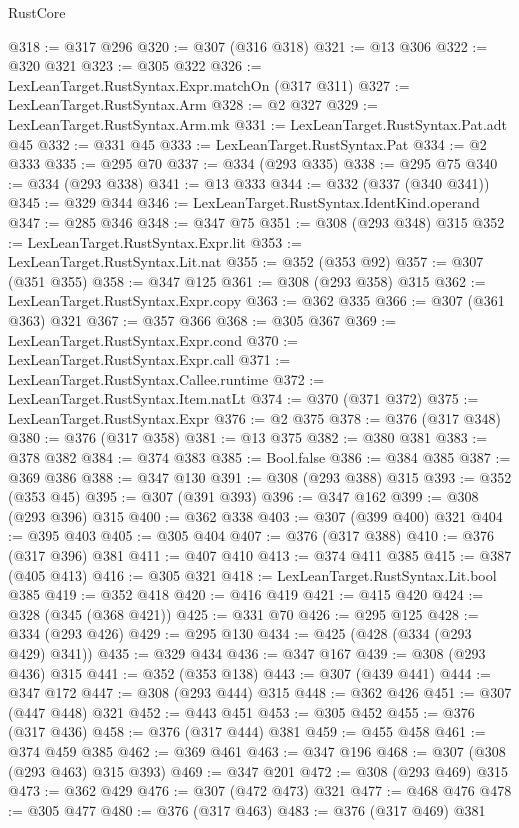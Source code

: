 \begin{lexlean}{RustCore}
\begin{coremodule}
@318 := @317 @296
@320 := @307 (@316 @318)
@321 := @13 @306
@322 := @320 @321
@323 := @305 @322
@326 := LexLeanTarget.RustSyntax.Expr.matchOn (@317 @311)
@327 := LexLeanTarget.RustSyntax.Arm
@328 := @2 @327
@329 := LexLeanTarget.RustSyntax.Arm.mk
@331 := LexLeanTarget.RustSyntax.Pat.adt @45
@332 := @331 @45
@333 := LexLeanTarget.RustSyntax.Pat
@334 := @2 @333
@335 := @295 @70
@337 := @334 (@293 @335)
@338 := @295 @75
@340 := @334 (@293 @338)
@341 := @13 @333
@344 := @332 (@337 (@340 @341))
@345 := @329 @344
@346 := LexLeanTarget.RustSyntax.IdentKind.operand
@347 := @285 @346
@348 := @347 @75
@351 := @308 (@293 @348) @315
@352 := LexLeanTarget.RustSyntax.Expr.lit
@353 := LexLeanTarget.RustSyntax.Lit.nat
@355 := @352 (@353 @92)
@357 := @307 (@351 @355)
@358 := @347 @125
@361 := @308 (@293 @358) @315
@362 := LexLeanTarget.RustSyntax.Expr.copy
@363 := @362 @335
@366 := @307 (@361 @363) @321
@367 := @357 @366
@368 := @305 @367
@369 := LexLeanTarget.RustSyntax.Expr.cond
@370 := LexLeanTarget.RustSyntax.Expr.call
@371 := LexLeanTarget.RustSyntax.Callee.runtime
@372 := LexLeanTarget.RustSyntax.Item.natLt
@374 := @370 (@371 @372)
@375 := LexLeanTarget.RustSyntax.Expr
@376 := @2 @375
@378 := @376 (@317 @348)
@380 := @376 (@317 @358)
@381 := @13 @375
@382 := @380 @381
@383 := @378 @382
@384 := @374 @383
@385 := Bool.false
@386 := @384 @385
@387 := @369 @386
@388 := @347 @130
@391 := @308 (@293 @388) @315
@393 := @352 (@353 @45)
@395 := @307 (@391 @393)
@396 := @347 @162
@399 := @308 (@293 @396) @315
@400 := @362 @338
@403 := @307 (@399 @400) @321
@404 := @395 @403
@405 := @305 @404
@407 := @376 (@317 @388)
@410 := @376 (@317 @396) @381
@411 := @407 @410
@413 := @374 @411 @385
@415 := @387 (@405 @413)
@416 := @305 @321
@418 := LexLeanTarget.RustSyntax.Lit.bool @385
@419 := @352 @418
@420 := @416 @419
@421 := @415 @420
@424 := @328 (@345 (@368 @421))
@425 := @331 @70
@426 := @295 @125
@428 := @334 (@293 @426)
@429 := @295 @130
@434 := @425 (@428 (@334 (@293 @429) @341))
@435 := @329 @434
@436 := @347 @167
@439 := @308 (@293 @436) @315
@441 := @352 (@353 @138)
@443 := @307 (@439 @441)
@444 := @347 @172
@447 := @308 (@293 @444) @315
@448 := @362 @426
@451 := @307 (@447 @448) @321
@452 := @443 @451
@453 := @305 @452
@455 := @376 (@317 @436)
@458 := @376 (@317 @444) @381
@459 := @455 @458
@461 := @374 @459 @385
@462 := @369 @461
@463 := @347 @196
@468 := @307 (@308 (@293 @463) @315 @393)
@469 := @347 @201
@472 := @308 (@293 @469) @315
@473 := @362 @429
@476 := @307 (@472 @473) @321
@477 := @468 @476
@478 := @305 @477
@480 := @376 (@317 @463)
@483 := @376 (@317 @469) @381

\end{coremodule}
\end{lexlean}
